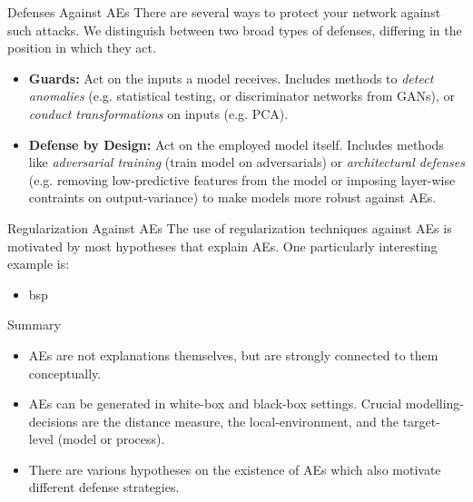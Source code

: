 \documentclass[11pt,compress,t,notes=noshow, xcolor=table]{beamer}
\begin{document}
\begin{vbframe}{Defenses Against AEs}
There are several ways to protect your network against such attacks. We distinguish between two broad types of defenses, differing in the position in which they act.
\begin{itemize}
    \item \textbf{Guards:} Act on the inputs a model receives. Includes methods to \emph{detect anomalies} (e.g. statistical testing, or discriminator networks from GANs), or \emph{conduct transformations} on inputs (e.g. PCA).
    \item \textbf{Defense by Design:} Act on the employed model itself. Includes methods like \emph{adversarial training} (train model on adversarials) or \emph{architectural defenses} (e.g. removing low-predictive features from the model or imposing layer-wise contraints on output-variance) to make models more robust against AEs.
\end{itemize}
\end{vbframe}

\begin{vbframe}{Regularization Against AEs}
The use of regularization techniques against AEs is motivated by most hypotheses that explain AEs. One particularly interesting example is:
\begin{itemize}
    \item bsp
\end{itemize}
\end{vbframe}

\begin{vbframe}{Summary}
\begin{itemize}
    \item AEs are not explanations themselves, but are strongly connected to them conceptually.
    \item AEs can be generated in white-box and black-box settings. Crucial modelling-decisions are the distance measure, the local-environment, and the target-level (model or process).
    \item There are various hypotheses on the existence of AEs which also motivate different defense strategies.
\end{itemize}
\end{vbframe}
\end{document}
